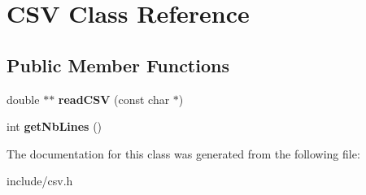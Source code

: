 \hypertarget{class_c_s_v}{\section{C\-S\-V Class Reference}
\label{class_c_s_v}
}
\subsection*{Public Member Functions}
\begin{DoxyCompactItemize}
\item 
\hypertarget{class_c_s_v_a8f7bf1a8981d755d1074b939f14f1205}{double $\ast$$\ast$ {\bfseries read\-C\-S\-V} (const char $\ast$)}\label{class_c_s_v_a8f7bf1a8981d755d1074b939f14f1205}

\item 
\hypertarget{class_c_s_v_aeb7056de851b1e8818507a853296bb1f}{int {\bfseries get\-Nb\-Lines} ()}\label{class_c_s_v_aeb7056de851b1e8818507a853296bb1f}

\end{DoxyCompactItemize}


The documentation for this class was generated from the following file\-:\begin{DoxyCompactItemize}
\item 
include/csv.\-h\end{DoxyCompactItemize}
